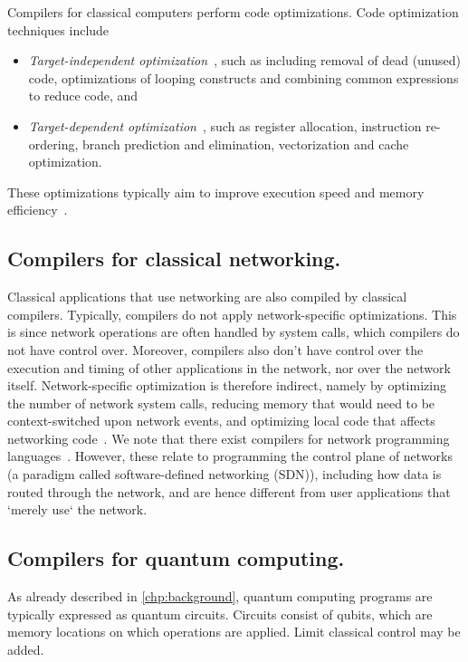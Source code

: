 Compilers for classical computers perform code optimizations.
Code optimization techniques include
\begin{itemize}
  \item \emph{Target-independent optimization}~\cite{frailey_intermediate_1979}, such as including removal of dead (unused) code, optimizations of looping constructs and combining common expressions to reduce code, and
  \item \emph{Target-dependent optimization}~\cite{chaitin_register_1981, smith_study_1981}, such as register allocation, instruction re-ordering, branch prediction and elimination, vectorization and cache optimization.
\end{itemize}
These optimizations typically aim to improve execution speed and memory efficiency~\cite{schneck_survey_1973, aho_compilers_2006}.

\subsection{Compilers for classical networking.}
Classical applications that use networking are also compiled by classical compilers.
Typically, compilers do not apply network-specific optimizations.
This is since network operations are often handled by system calls, which compilers do not have control over.
Moreover, compilers also don't have control over the execution and timing of other applications in the network, nor over the network itself.
Network-specific optimization is therefore indirect, namely by optimizing the number of network system calls, reducing memory that would need to be context-switched upon network events, and optimizing local code that affects networking code~\cite{danalis_mpi-aware_2009}.
We note that there exist compilers for network programming languages~\cite{monsanto_compiler_2012, li_modular_2020}.
However, these relate to programming the control plane of networks (a paradigm called software-defined networking (SDN)), including how data is routed through the network, and are hence different from user applications that `merely use` the network.


\subsection{Compilers for quantum computing.}
\label{compiler:sec:compilers-qc}
As already described in \cref{chp:background}, quantum computing programs are typically expressed as quantum circuits.
Circuits consist of qubits, which are memory locations on which operations are applied.
Limit classical control may be added.

